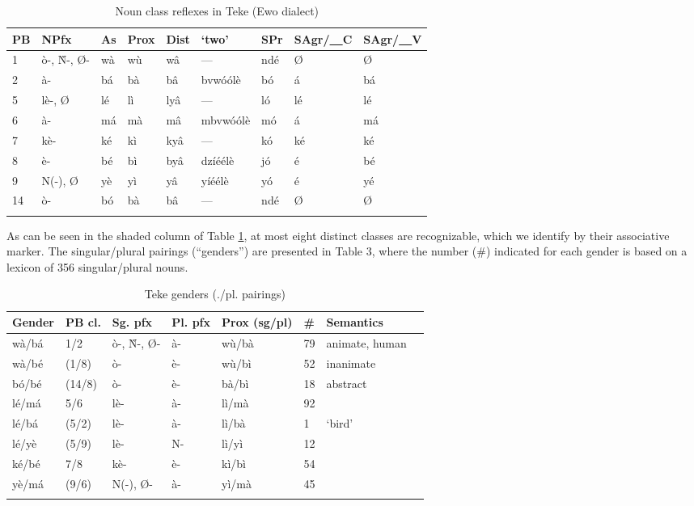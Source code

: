 \documentclass[output=paper,,modfonts,nonflat]{langsci/langscibook-Hyman-et-al}
\begin{document}
\begin{table}[!htbp]
\caption{\small{Noun class reflexes in Teke (Ewo dialect)}}
\label{table2}
\begin{small}
\begin{tabular}{l		l		l		l		l		l		l		l		l		}
  \lsptoprule
PB	&	NPfx	&	\cellcolor{gray!60}As	&	Prox	&	Dist	&	`two’	&	SPr	&	SAgr/\underline{~~}C	&	SAgr/\underline{~~}V	\\	
\midrule
1	&	ò-, Ǹ-, Ø-	&	\cellcolor{gray!60}wà	&	wù	&	wâ	&	---	&	ndé	&	Ø	&	Ø	\\	
2	&	à-	&	\cellcolor{gray!60}bá	&	bà	&	bâ	&	bvwóólè	&	bó	&	á	&	bá	\\	
5	&	lè-, Ø	&	\cellcolor{gray!60}lé	&	lì	&	lyâ	&	---	&	ló	&	lé	&	lé	\\	
6	&	à-	&	\cellcolor{gray!60}má	&	mà	&	mâ	&	mbvwóólè	&	mó	&	á	&	má	\\	
7	&	kè-	&	\cellcolor{gray!60}ké	&	kì	&	kyâ	&	---	&	kó	&	ké	&	ké	\\	
8	&	è-	&	\cellcolor{gray!60}bé	&	bì	&	byâ	&	dzíéélè	&	jó	&	é	&	bé	\\	
9	&	N(-), Ø	&	\cellcolor{gray!60}yè	&	yì	&	yâ	&	yíéélè	&	yó	&	é	&	yé	\\	
14	&	ò-	&	\cellcolor{gray!60}bó	&	bà	&	bâ	&	---	&	ndé	&	Ø	&	Ø	\\
  \lspbottomrule
\end{tabular}
\end{small}
\end{table}

As can be seen in the shaded column of Table \ref{table2}, at most eight distinct classes are recognizable, which we identify by their associative marker. The singular/plural pairings (“genders”) are presented in Table 3, where the number (\#) indicated for each gender is based on a lexicon of 356 singular/plural nouns.

\begin{table}[!htbp]
\caption{Teke genders (./pl. pairings)}
\label{table3}
\begin{small}
\begin{tabular}{l		l		l		l		l		l		l		l		}
  \lsptoprule
Gender	&	PB cl.	&	Sg. pfx	&	Pl. pfx	&	Prox (sg/pl)	&	\#	&	Semantics	\\	
\midrule
wà/bá	&	1/2	&	ò-, Ǹ-, Ø-	&	  à-	&	wù/bà	&	79	&	animate, human	\\	
wà/bé	&	(1/8)	&	ò-	&	  è-	&	wù/bì	&	52	&	inanimate	\\	
bó/bé	&	(14/8)	&	ò-	&	  è-	&	bà/bì	&	18	&	abstract	\\	
lé/má	&	5/6	&	lè-	&	  à-	&	lì/mà	&	92	&		\\	
lé/bá	&	(5/2)	&	lè-	&	  à-	&	lì/bà	&	1	&	`bird’ 	\\	
lé/yè	&	(5/9)	&	lè-	&	  N-	&	lì/yì	&	12	&		\\	
ké/bé	&	7/8	&	kè-	&	  è-	&	kì/bì	&	54	&		\\	
yè/má	&	(9/6)	&	N(-), Ø-	&	  à-	&	yì/mà	&	45	&		\\	
  \lspbottomrule
\end{tabular}
\end{small}
\end{table}
\end{document}
